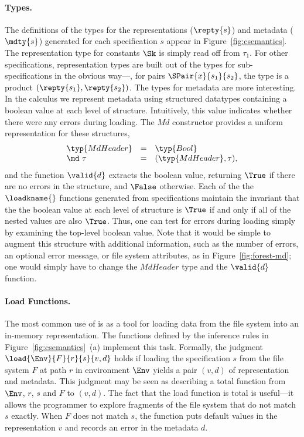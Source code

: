 \paragraph*{Types.}
%
The definitions of the types for the representations ($\repty{s}$) and
metadata ($\mdty{s}$) generated for each specification $s$ appear in
Figure~\ref{fig:csemantics}. 
The representation type for constants $\Sk$ is simply
read off from $\tau_1$. For other specifications, representation types
are built out of the types for sub-specifications in the obvious
way---\eg, for pairs $\SPair{x}{s_1}{s_2}$, the type is a product
$(\repty{s_1}, \repty{s_2})$. 
The types for metadata are more
interesting.  In the \forest{} calculus we represent metadata using
structured datatypes containing a boolean value at each level of
structure. Intuitively, this value indicates whether there were any
errors during loading. The $\mathit{Md}$ constructor provides a
uniform representation for these structures,
\[
\begin{array}{lcl}
\typ{MdHeader} & = & \typ{Bool} \\
\md~{\tau} & = & (\typ{MdHeader}, \tau),
\end{array}
\]
and the function $\valid{d}$ extracts the boolean value, returning
$\True$ if there are no errors in the structure, and $\False$
otherwise. Each of the the $\loadkname{}$ functions generated from
specifications maintain the invariant that the the boolean value at
each level of structure is $\True$ if and only if all of the nested
values are also $\True$. Thus, one can test for errors during loading
simply by examining the top-level boolean value.  Note that it would
be simple to augment this structure with additional information, such
as the number of errors, an optional error message, or file system
attributes, as in Figure~\ref{fig:forest-md}; one would simply have to
change the $\mathit{MdHeader}$ type and the $\valid{d}$ function.

\paragraph*{Load Functions.}
%
The most common use of \forest{} is as a tool for loading data from
the file system into an in-memory representation. The functions
defined by the inference rules in Figure~\ref{fig:csemantics}~(a)
implement this task.  Formally, the judgment
$\load{\Env}{F}{r}{s}{v,d}$ holds if loading the specification $s$
from the file system $F$ at path $r$ in environment $\Env$ yields a
pair $(v,d)$ of representation and metadata. This judgment may be seen
as describing a total function from $\Env$, $r$, $s$ and $F$ to
$(v,d)$. The fact that the load function is total is useful---it
allows the programmer to explore fragments of the file system that do
not match $s$ exactly. When $F$ does not match $s$, the function puts
default values in the representation $v$ and records an error in the
metadata $d$.

